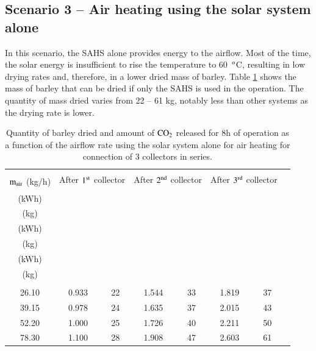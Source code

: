 \subsection{Scenario 3 -- Air heating using the solar system alone}

In this scenario, the SAHS alone provides energy to the airflow. Most of the time, the solar energy is insufficient to rise the temperature to 60~$^{\rm{o}}$C, resulting in low drying rates and, therefore, in a lower dried mass of barley. Table \ref{solar-only} shows the mass of barley that can be dried if only the SAHS is used in the operation. The quantity of mass dried varies from 22 -- 61 kg, notably less than other systems as the drying rate is lower. 

\begin{table}[h]
	\caption{Quantity of barley dried and amount of $\rm{CO_2}$ released for 8h of operation as a function of the airflow rate using the solar system alone for air heating for connection of 3 collectors in series.}
	\centering
	
	\begin{tabular}{cccccccc}
		\hline \\ [-10pt]
		\multirow{2}{*}{ $\rm{m_{air}}$  (kg/h)} & \multicolumn{2}{c}{After $\rm{1^{st}}$ collector} & \multicolumn{2}{c}{After $\rm{2^{nd}}$ collector} & \multicolumn{2}{c}{After $\rm{3^{rd}}$ collector} \\
		
		 & \makecell{$\rm{Q_{u}}$ \\ (kWh)} & 	\makecell{$\rm{M_{bar,dried}}$ \\ (kg)} & 	\makecell{$\rm{Q_{u}}$  \\ (kWh)} & \makecell{$\rm{M_{bar,dried}}$ \\ (kg)} & \makecell{$\rm{Q_{u}}$  \\ (kWh)} & \makecell{$\rm{M_{bar,dried}}$ \\ (kg)} \\
		\hline \\ [-10pt]
		26.10 & 0.933 & 22 & 1.544 & 33 & 1.819 & 37 \\ [2pt]
		39.15 & 0.978 & 24 & 1.635 & 37 & 2.015 & 43 \\ [2pt]
		52.20 & 1.000 & 25 & 1.726 & 40 & 2.211 & 50 \\ [2pt]
		78.30 & 1.100 & 28 & 1.908 & 47 & 2.603 & 61 \\ 
		\hline
	\end{tabular}
	
	\label{solar-only}
\end{table}


